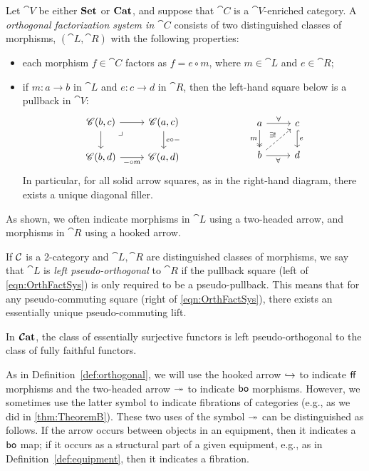 \documentclass[12pt,oneside,article,draft]{memoir}
\begin{document}
\begin{definition}\label{def:orthogonal}
Let $\cat{V}$ be either $\mathbf{Set}$ or $\mathbf{Cat}$, and suppose that $\cat{C}$ is a $\cat{V}$-enriched category. A \emph{orthogonal factorization system in $\cat{C}$} consists of two distinguished classes of morphisms, $(\cat{L},\cat{R})$ with the following properties:
\begin{itemize}
\item each morphism $f\in\cat{C}$ factors as $f=e\circ m$, where $m\in\cat{L}$ and $e\in\cat{R}$;
\item if $m\colon a\to b$ in $\cat{L}$ and $e\colon c\to d$ in $\cat{R}$, then the left-hand square below is a pullback in $\cat{V}$:
\begin{equation}\label{eqn:OrthFactSys}
\begin{tikzcd}
\cat{C}(b,c)\ar[r]\ar[d]\ar[rd,phantom,"\lrcorner" very near start]&\cat{C}(a,c)\ar[d,"e\circ -"]\\
\cat{C}(b,d)\ar[r,"-\circ m"']&\cat{C}(a,d)
\end{tikzcd}
\hspace{.9in}
\begin{tikzcd}
a\ar[r,"\forall"]\ar[d,two heads,"m"']&c\ar[d,hook, "e"]\\
b\ar[r,"\forall"']\ar[ur,dashed,"\exists!"]&d
\end{tikzcd}
\end{equation}
In particular, for all solid arrow squares, as in the right-hand diagram, there exists a unique diagonal filler. 
\end{itemize}
As shown, we often indicate morphisms in $\cat{L}$ using a two-headed arrow, and morphisms in $\cat{R}$ using a hooked arrow.
\end{definition}

If $\mathcal{C}$ is a 2-category and $\cat{L}, \cat{R}$ are distinguished classes of morphisms, we say that $\cat{L}$ is \emph{left pseudo-orthogonal} to $\cat{R}$ if the pullback square (left of \eqref{eqn:OrthFactSys}) is only required to be a pseudo-pullback. This means that for any pseudo-commuting square (right of \eqref{eqn:OrthFactSys}), there exists an essentially unique pseudo-commuting lift.

\begin{example}\label{ex:ess_surj_pseudo_ff}
In $\bm{\mathcal{C}}\mathbf{at}$, the class of essentially surjective functors is left pseudo-orthogonal to the class of fully faithful functors.
\end{example}

\begin{remark}

As in Definition~\ref{def:orthogonal}, we will use the hooked arrow $\hookrightarrow$ to indicate $\mathsf{ff}$ morphisms and the two-headed arrow $\twoheadrightarrow$ to indicate $\mathsf{bo}$ morphisms. However, we sometimes use the latter symbol to indicate fibrations of categories (e.g., as we did in \ref{thm:TheoremB}). These two uses of the symbol $\twoheadrightarrow$ can be distinguished as follows. If the arrow occurs between objects in an equipment, then it indicates a $\mathsf{bo}$ map; if it occurs as a structural part of a given equipment, e.g., as in Definition~\ref{def:equipment}, then it indicates a fibration. 

\end{remark}
\end{document}
